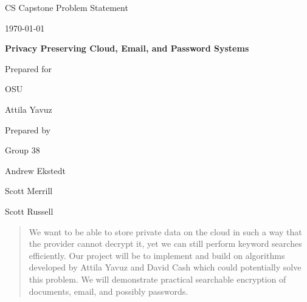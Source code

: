 \documentclass[onecolumn, draftclsnofoot,10pt, compsoc]{IEEEtran}
\def \CapstoneTeamName{		The Cleverly Named Team}
\def \CapstoneTeamNumber{		38}
\def \GroupMemberOne{			Andrew Ekstedt}
\def \GroupMemberTwo{			Scott Merrill}
\def \GroupMemberThree{			Scott Russell}
\def \CapstoneProjectName{		Privacy Preserving Cloud, Email, and Password Systems}
\def \CapstoneSponsorCompany{	OSU}
\def \CapstoneSponsorPerson{		Attila Yavuz}
\def \DocType{		Problem Statement }
\newcommand{\NameSigPair}[1]{\par
\makebox[2.75in][r]{#1} \hfil 	\makebox[3.25in]{\makebox[2.25in]{\hrulefill} \hfill		\makebox[.75in]{\hrulefill}}
\par\vspace{-12pt} \textit{\tiny\noindent
\makebox[2.75in]{} \hfil		\makebox[3.25in]{\makebox[2.25in][r]{Signature} \hfill	\makebox[.75in][r]{Date}}}}
\renewcommand{\NameSigPair}[1]{#1}
\begin{document}
\begin{titlepage}
    \begin{singlespace}
        \hfill
        \par\vspace{.2in}
        \centering
        \scshape{
            \huge CS Capstone \DocType \par
            {\large\today}\par
            \vspace{.5in}
            \textbf{\Huge\CapstoneProjectName}\par
            \vfill
            {\large Prepared for}\par
            \Huge \CapstoneSponsorCompany\par
            \vspace{5pt}
            {\Large\NameSigPair{\CapstoneSponsorPerson}\par}
            {\large Prepared by }\par
            Group\CapstoneTeamNumber\par
            \vspace{5pt}
            {\Large
                \NameSigPair{\GroupMemberOne}\par
                \NameSigPair{\GroupMemberTwo}\par
                \NameSigPair{\GroupMemberThree}\par
            }
            \vspace{20pt}
        }
        \begin{abstract}
            We want to be able to store private data on the cloud in such a way that the provider cannot decrypt it, yet we can still perform keyword searches efficiently.
            Our project will be to implement and build on algorithms developed by Attila Yavuz and David Cash which could potentially solve this problem.
            We will demonstrate practical searchable encryption of documents, email, and possibly passwords.

        \end{abstract}
    \end{singlespace}
\end{titlepage}
\newpage
{}
\tableofcontents
\clearpage
\end{document}

